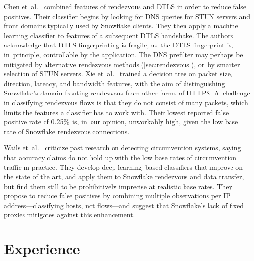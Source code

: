 \documentclass[letterpaper,twocolumn]{article}
\begin{document}
Chen et~al.~\cite{Chen2023a}
combined features
of rendezvous and DTLS
in order to reduce false positives.
Their classifier begins
by looking for DNS queries for
STUN servers and front domains typically used by Snowflake clients.
They then apply a machine learning classifier
to features of a subsequent DTLS handshake.
The authors acknowledge that DTLS fingerprinting
is fragile, as~the DTLS fingerprint is, in~principle,
controllable by the application.
The DNS prefilter may perhaps be mitigated
by alternative rendezvous methods (\autoref{sec:rendezvous}),
or~by smarter selection of STUN servers.
Xie et~al.~\cite{Xie2023a} trained a decision tree on
packet size, direction, latency, and bandwidth features, with the aim of
distinguishing Snowflake's domain fronting rendezvous
from other forms of HTTPS.
A~challenge in classifying rendezvous flows
is that they do not consist of many packets,
which limits the features a classifier has to work with.
Their lowest reported false positive rate of 0.25\%~is,
in~our opinion, unworkably high,
given the low base rate of Snowflake rendezvous connections.

Wails et~al.~\cite{Wails2024a}
criticize past research on detecting circumvention systems,
saying that accuracy claims do not hold up
with the low base rates of circumvention traffic in practice.
They develop deep learning--based classifiers
that improve on the state of the art,
and apply them to Snowflake rendezvous and data transfer,
but find them still to be prohibitively imprecise at realistic base rates.
They propose to reduce false positives by combining
multiple observations per IP address---classifying hosts,
not flows---and suggest that Snowflake's lack of
fixed proxies mitigates against this enhancement.

\section{Experience}
\label{sec:experience}
\end{document}
